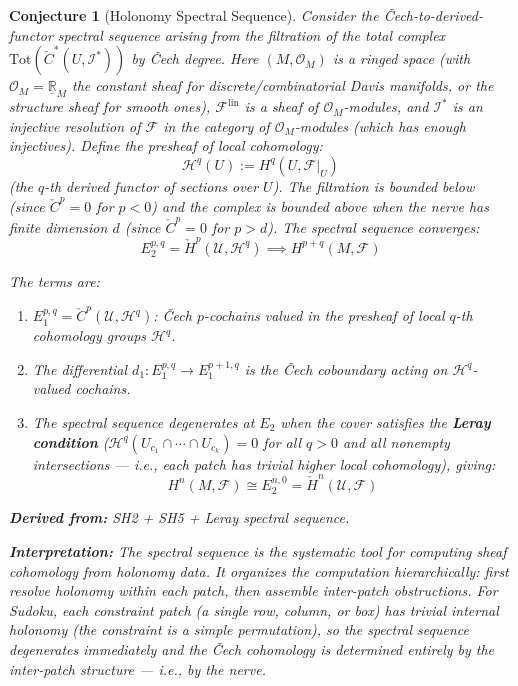 \documentclass[11pt,letterpaper]{article}
\newtheorem{conjecture}{Conjecture}[section]
\newcommand{\Cech}{\check{C}}
\newcommand{\Hcech}{\check{H}}
\newcommand{\sheaf}{\mathcal{F}}
\newcommand{\cover}{\mathcal{U}}
\begin{document}
\begin{conjecture}[Holonomy Spectral 
Sequence]\label{conj:spectral}
Consider the \v{C}ech-to-derived-functor spectral sequence arising 
from the filtration of the total complex $\mathrm{Tot}(\Cech^*(U, 
\mathcal{I}^*))$ by \v{C}ech degree. Here $(M, \mathcal{O}_M)$ is 
a ringed space (with $\mathcal{O}_M = \underline{\mathbb{R}}_M$ the 
constant sheaf for discrete/combinatorial Davis manifolds, or the 
structure sheaf for smooth ones), $\sheaf^{\mathrm{lin}}$ is a sheaf 
of $\mathcal{O}_M$-modules, and $\mathcal{I}^*$ is an injective 
resolution of $\sheaf$ in the category of $\mathcal{O}_M$-modules 
(which has enough injectives). 
Define the \emph{presheaf of local cohomology}:
\[
    \mathcal{H}^q(U) := H^q(U, \sheaf|_U)
\]
(the $q$-th derived functor of sections over $U$). The filtration is 
bounded below (since $\Cech^p = 0$ for $p < 0$) and the complex is 
bounded above when the nerve has finite dimension $d$ (since 
$\Cech^p = 0$ for $p > d$). The spectral sequence converges:
\begin{equation}\label{eq:spectral_convergence}
    E_2^{p,q} = \Hcech^p(\cover, \mathcal{H}^q) \implies 
    H^{p+q}(M, \sheaf)
\end{equation}

The terms are:

\begin{enumerate}[label=(\alph*)]
    \item $E_1^{p,q} = \Cech^p(\cover, \mathcal{H}^q)$: 
    \v{C}ech $p$-cochains valued in the presheaf of local $q$-th 
    cohomology groups $\mathcal{H}^q$.
    
    \item The differential $d_1 : E_1^{p,q} \to E_1^{p+1,q}$ is the 
    \v{C}ech coboundary acting on $\mathcal{H}^q$-valued cochains.
    
    \item The spectral sequence degenerates at $E_2$ when the 
    cover satisfies the \textbf{Leray condition} 
    ($\mathcal{H}^q(U_{c_1} \cap \cdots \cap U_{c_k}) = 0$ for all 
    $q > 0$ and all nonempty intersections --- i.e., each patch has 
    trivial higher local cohomology), giving:
    \begin{equation}\label{eq:spectral_degenerate}
        H^n(M, \sheaf) \cong E_2^{n,0} = \Hcech^n(\cover, 
        \sheaf)
    \end{equation}
\end{enumerate}

\textbf{Derived from:} SH2 + SH5 + Leray spectral sequence.

\textbf{Interpretation:} The spectral sequence is the systematic tool 
for computing sheaf cohomology from holonomy data. It organizes the 
computation hierarchically: first resolve holonomy within each patch, 
then assemble inter-patch obstructions. For Sudoku, each constraint 
patch (a single row, column, or box) has trivial internal holonomy 
(the constraint is a simple permutation), so the spectral sequence 
degenerates immediately and the \v{C}ech cohomology is determined 
entirely by the inter-patch structure --- i.e., by the nerve.
\end{conjecture}
\end{document}
